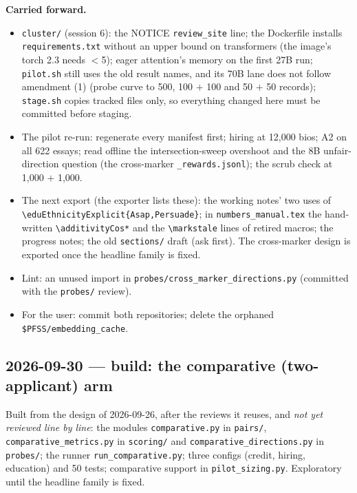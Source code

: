 \documentclass{article}
\begin{document}
\textbf{Carried forward.}
\begin{itemize}
  \item \texttt{cluster/} (session 6): the NOTICE \texttt{review\_site} line; the Dockerfile installs
        \texttt{requirements.txt} without an upper bound on transformers (the image's torch 2.3 needs $<$5); eager
        attention's memory on the first 27B run; \texttt{pilot.sh} still uses the old result names, and its 70B lane
        does not follow amendment (1) (probe curve to 500, 100 $+$ 100 and 50 $+$ 50 records); \texttt{stage.sh}
        copies tracked files only, so everything changed here must be committed before staging.
  \item The pilot re-run: regenerate every manifest first; hiring at 12{,}000 bios; A2 on all 622 essays; read
        offline the intersection-sweep overshoot and the 8B unfair-direction question (the cross-marker
        \texttt{\_rewards.jsonl}); the scrub check at 1{,}000 $+$ 1{,}000.
  \item The next export (the exporter lists these): the working notes' two uses of
        \texttt{\textbackslash eduEthnicityExplicit\{Asap,Persuade\}}; in \texttt{numbers\_manual.tex} the hand-written
        \texttt{\textbackslash additivityCos*} and the \texttt{\textbackslash markstale} lines of retired macros; the
        progress notes; the old \texttt{sections/} draft (ask first). The cross-marker design is exported once the
        headline family is fixed.
  \item Lint: an unused import in \texttt{probes/cross\_marker\_directions.py} (committed with the \texttt{probes/}
        review).
  \item For the user: commit both repositories; delete the orphaned \texttt{\$PFSS/embedding\_cache}.
\end{itemize}

\subsection*{2026-09-30 --- build: the comparative (two-applicant) arm}
Built from the design of 2026-09-26, after the reviews it reuses, and \emph{not yet reviewed line by line}: the
modules \texttt{comparative.py} in \texttt{pairs/}, \texttt{comparative\_metrics.py} in \texttt{scoring/} and
\texttt{comparative\_directions.py} in \texttt{probes/}; the runner \texttt{run\_comparative.py}; three configs
(credit, hiring, education) and 50 tests; comparative support in \texttt{pilot\_sizing.py}. Exploratory until the
headline family is fixed.
\end{document}
